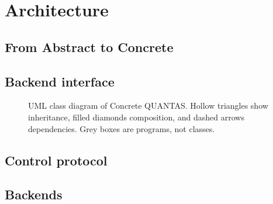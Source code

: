 \section{Architecture}
\label{sec:architecture}


\subsection{From Abstract to Concrete}

\subsection{Backend interface}

\begin{figure}
  \centering
  
  \caption{UML class diagram of Concrete QUANTAS. Hollow triangles show inheritance, filled diamonds composition, and dashed arrows dependencies. Grey boxes are programs, not classes.}
  \label{fig:concrete-uml}
\end{figure}

\subsection{Control protocol}

\subsection{Backends}
